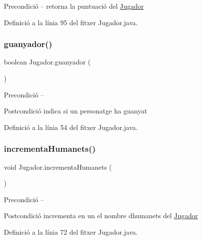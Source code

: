 \begin{DoxyPrecond}{Precondició}
--  retorna la puntuació del \mbox{\hyperlink{class_jugador}{Jugador}} 
\end{DoxyPrecond}


Definició a la línia 95 del fitxer Jugador.\+java.

\mbox{\label{class_jugador_ae09056db510ac7461366abd9774754f9}} 
\subsubsection{\texorpdfstring{guanyador()}{guanyador()}}
{\footnotesize\ttfamily boolean Jugador.\+guanyador (\begin{DoxyParamCaption}{ }\end{DoxyParamCaption})}

\begin{DoxyPrecond}{Precondició}
-- 
\end{DoxyPrecond}
\begin{DoxyPostcond}{Postcondició}
indica si un personatge ha guanyat 
\end{DoxyPostcond}


Definició a la línia 54 del fitxer Jugador.\+java.

\mbox{\label{class_jugador_a2338c2d33521058c2d9d2804c2e481f4}} 
\subsubsection{\texorpdfstring{incrementa\+Humanets()}{incrementaHumanets()}}
{\footnotesize\ttfamily void Jugador.\+incrementa\+Humanets (\begin{DoxyParamCaption}{ }\end{DoxyParamCaption})}

\begin{DoxyPrecond}{Precondició}
-- 
\end{DoxyPrecond}
\begin{DoxyPostcond}{Postcondició}
incrementa en un el nombre d\textquotesingle{}humanets del \mbox{\hyperlink{class_jugador}{Jugador}} 
\end{DoxyPostcond}


Definició a la línia 72 del fitxer Jugador.\+java.


